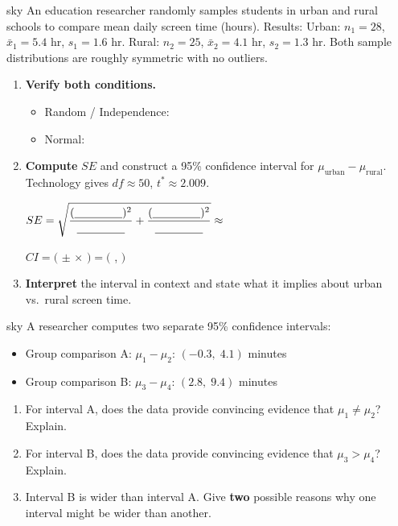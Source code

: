 \documentclass[10pt]{article}
\begin{document}
\begin{scenariobox}{sky}
An education researcher randomly samples students in urban and rural schools to compare
mean daily screen time (hours). Results:
Urban: $n_1 = 28$, $\bar x_1 = 5.4$ hr, $s_1 = 1.6$ hr. \quad
Rural: $n_2 = 25$, $\bar x_2 = 4.1$ hr, $s_2 = 1.3$ hr.
Both sample distributions are roughly symmetric with no outliers.

\begin{enumerate}[label=\alph*.]
  \item \textbf{Verify both conditions.}
        \begin{itemize}
          \item Random / Independence: \writeline
          \item Normal: \writeline
        \end{itemize}

  \item \textbf{Compute} $SE$ and construct a 95\% confidence interval for $\mu_{\text{urban}} - \mu_{\text{rural}}$.
        Technology gives $df \approx 50$, $t^* \approx 2.009$.

        $SE = \sqrt{\dfrac{(\blank{1.5cm})^2}{\blank{1.5cm}} + \dfrac{(\blank{1.5cm})^2}{\blank{1.5cm}}} \approx$ \blank{2.5cm}

        $CI = ($ \blank{2cm} $\pm$ \blank{2cm} $\times$ \blank{2cm} $) = ($ \blank{3cm} , \blank{3cm} $)$

  \item \textbf{Interpret} the interval in context and state what it implies about urban vs.\ rural screen time.
\end{enumerate}
\end{scenariobox}

\begin{scenariobox}{sky}
A researcher computes two separate 95\% confidence intervals:
\begin{itemize}
  \item Group comparison A: $\mu_1 - \mu_2$: $(-0.3, \; 4.1)$ minutes
  \item Group comparison B: $\mu_3 - \mu_4$: $(2.8, \; 9.4)$ minutes
\end{itemize}

\begin{enumerate}[label=\alph*.]
  \item For interval A, does the data provide convincing evidence that $\mu_1 \ne \mu_2$?
        Explain. 

  \item For interval B, does the data provide convincing evidence that $\mu_3 > \mu_4$?
        Explain. 

  \item Interval B is wider than interval A. Give \textbf{two} possible reasons why one
        interval might be wider than another. 
\end{enumerate}
\end{scenariobox}
\end{document}

